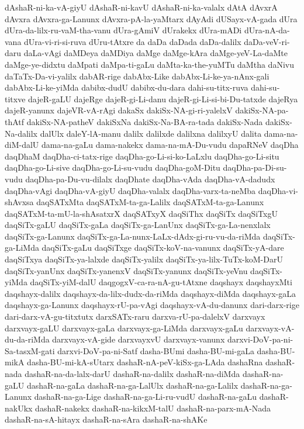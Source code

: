 {dAshaR-ni-ka-vA-giyU
dAshaR-ni-kavU
dAshaR-ni-ka-valalx
dAtA
dAvxrA
dAvxra
dAvxra-ga-Lanunx
dAvxra-pA-la-yaMtarx
dAyAdi
dUSayx-vA-gada
dUra
dUra-da-lilx-ru-vaM-tha-vanu
dUra-gAmiV
dUrakekx
dUra-mADi
dUra-nA-da-vana
dUra-vi-ri-si-ruva
dUru-tAtxre
da
daDa
daDada
daDa-dalilx
daDa-veV-ri-daru
daLa-vAgi
daMDeya
daMDiya
daMge
daMge-kAra
daMge-yeV-La-daMte
daMge-ye-didxtu
daMpati
daMpa-ti-gaLu
daMta-ka-the-yuMTu
daMtha
daNivu
daTaTx-Da-vi-yalilx
dabAR-rige
dabAbx-Like
dabAbx-Li-ke-ya-nAnx-gali
dabAbx-Li-ke-yiMda
dabibx-dudU
dabibx-du-dara
dahi-su-titx-ruva
dahi-su-titxve
dajeR-gaLU
dajeRge
dajeR-gi-Li-danu
dajeR-gi-Li-si-bi-Du-tatxde
dajeRya
dajeR-yanunx
dajeVR-vA-rAgi
dakaSx
dakiSx-NA-gi-ri-yalelxV
dakiSx-NA-pa-thAtf
dakiSx-NA-patheV
dakiSxNa
dakiSx-Na-BA-ra-tada
dakiSx-Nada
dakiSx-Na-dalilx
dalUlx
daleY-lA-manu
dalilx
dalilxde
dalilxna
dalilxyU
dalita
dama-na-diM-dalU
dama-na-gaLu
dama-nakekx
dama-na-mA-Du-vudu
dapaRNeV
daqDha
daqDhaM
daqDha-ci-tatx-rige
daqDha-go-Li-si-ko-LaLxlu
daqDha-go-Li-situ
daqDha-go-Li-sive
daqDha-go-Li-su-vudu
daqDha-goM-Ditu
daqDha-pa-Di-su-vudu
daqDha-pa-Du-vu-dilalx
daqDhate
daqDha-vAda
daqDha-vA-dadudx
daqDha-vAgi
daqDha-vA-giyU
daqDha-valalx
daqDha-varx-ta-neMba
daqDha-vi-shAvxsa
daqSATxMta
daqSATxM-ta-ga-Lalilx
daqSATxM-ta-ga-Lanunx
daqSATxM-ta-mU-la-shAsatxrX
daqSATxyX
daqSiThx
daqSiTx
daqSiTxgU
daqSiTx-gaLU
daqSiTx-gaLa
daqSiTx-ga-LanUnx
daqSiTx-ga-La-nenxlalx
daqSiTx-ga-Lanunx
daqSiTx-ga-La-nunx-LaLx-dAdx-gi-ru-vu-da-riMda
daqSiTx-ga-LiMda
daqSiTx-gaLu
daqSiTxge
daqSiTx-koV-na-vanunx
daqSiTx-yA-dare
daqSiTxya
daqSiTx-ya-lalxde
daqSiTx-yalilx
daqSiTx-ya-lilx-TuTx-koM-DarU
daqSiTx-yanUnx
daqSiTx-yanenxV
daqSiTx-yanunx
daqSiTx-yeVnu
daqSiTx-yiMda
daqSiTx-yiM-dalU
daqgogxV-ca-ra-nA-gu-tAtxne
daqshayx
daqshayxMti
daqshayx-dalilx
daqshayx-da-lilx-dudx-da-riMda
daqshayx-diMda
daqshayx-gaLa
daqshayx-ga-Lanunx
daqshayx-rU-pa-vAgi
daqshayx-vA-du-danunx
dari-darx-rige
dari-darx-vA-gu-titxtutx
darxSATx-raru
darxva-rU-pa-dalelxV
darxvayx
darxvayx-gaLU
darxvayx-gaLa
darxvayx-ga-LiMda
darxvayx-gaLu
darxvayx-vA-du-da-riMda
darxvayx-vA-gide
darxvayxvU
darxvayx-vanunx
darxvi-DoV-pa-ni-Sa-tasxM-gati
darxvi-DoV-pa-ni-Satf
dasha-BUmi
dasha-BU-mi-gaLa
dasha-BU-mikA
dasha-BU-mi-kA-sUtarx
dashaR-nA-peV-kiSx-ga-LAda
dashaRna
dashaR-nada
dashaR-na-da-lalx-darU
dashaR-na-dalilx
dashaR-na-diMda
dashaR-na-gaLU
dashaR-na-gaLa
dashaR-na-ga-LalUlx
dashaR-na-ga-Lalilx
dashaR-na-ga-Lanunx
dashaR-na-ga-Lige
dashaR-na-ga-Li-ru-vudU
dashaR-na-gaLu
dashaR-nakUkx
dashaR-nakekx
dashaR-na-kikxM-talU
dashaR-na-parx-mA-Nada
dashaR-na-sA-hitayx
dashaR-na-sAra
dashaR-na-shAKe
}
